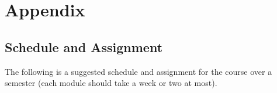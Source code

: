 \documentclass[oneside,11pt,dvipsnames]{book}
\begin{document}


\part{Appendix}
\appendix

\chapter{Schedule and Assignment}\label{sec:schedule}

The following is a suggested schedule and assignment for the course over a semester (each module should take a week or two at most).
\end{document}

